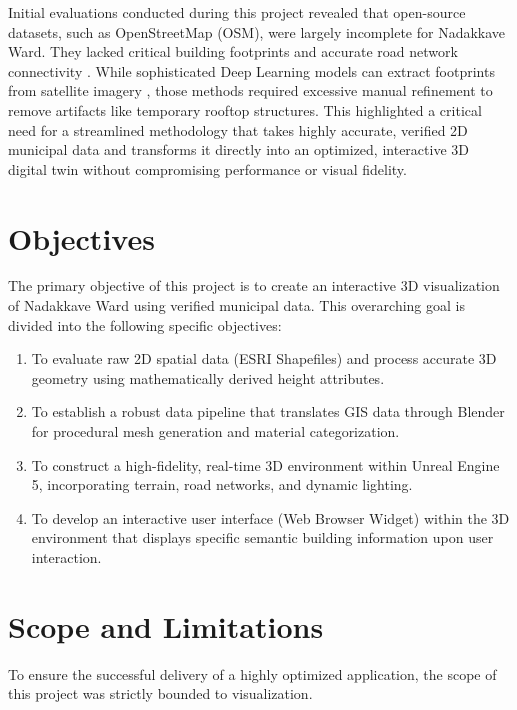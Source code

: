 Initial evaluations conducted during this project revealed that open-source datasets, such as OpenStreetMap (OSM), were largely incomplete for Nadakkave Ward. They lacked critical building footprints and accurate road network connectivity \cite{ref_osm_limitations}. While sophisticated Deep Learning models can extract footprints from satellite imagery \cite{ref_deep_learning_gis}, those methods required excessive manual refinement to remove artifacts like temporary rooftop structures. This highlighted a critical need for a streamlined methodology that takes highly accurate, verified 2D municipal data and transforms it directly into an optimized, interactive 3D digital twin without compromising performance or visual fidelity.

\section{Objectives}
The primary objective of this project is to create an interactive 3D visualization of Nadakkave Ward using verified municipal data. This overarching goal is divided into the following specific objectives:
\begin{enumerate}
    \item To evaluate raw 2D spatial data (ESRI Shapefiles) and process accurate 3D geometry using mathematically derived height attributes.
    \item To establish a robust data pipeline that translates GIS data through Blender for procedural mesh generation and material categorization.
    \item To construct a high-fidelity, real-time 3D environment within Unreal Engine 5, incorporating terrain, road networks, and dynamic lighting.
    \item To develop an interactive user interface (Web Browser Widget) within the 3D environment that displays specific semantic building information upon user interaction.
\end{enumerate}

\section{Scope and Limitations}
To ensure the successful delivery of a highly optimized application, the scope of this project was strictly bounded to visualization.

